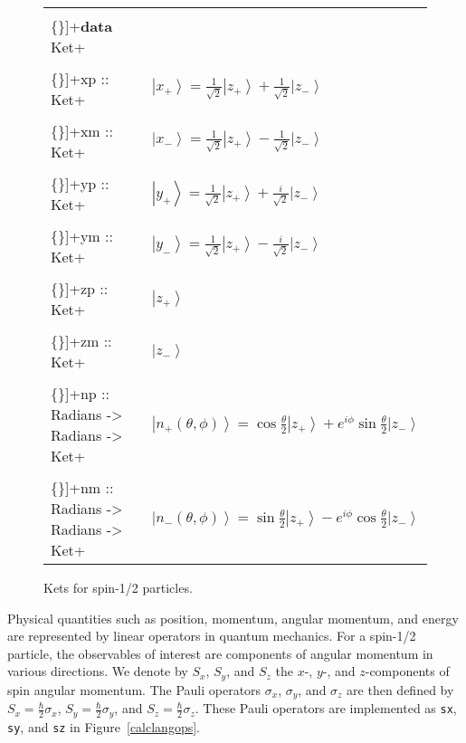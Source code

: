 \documentclass{eptcs}
\newcommand{\VERB}{\Verb[commandchars=\\\{\}]}
\newcommand{\KeywordTok}[1]{\textcolor[rgb]{0.00,0.44,0.13}{\textbf{{#1}}}}
\newcommand{\DataTypeTok}[1]{\textcolor[rgb]{0.56,0.13,0.00}{{#1}}}
\newcommand{\SpecialCharTok}[1]{\textcolor[rgb]{0.25,0.44,0.63}{{#1}}}
\newcommand{\FunctionTok}[1]{\textcolor[rgb]{0.02,0.16,0.49}{{#1}}}
\newcommand{\ket}[1]{\left| #1 \right\rangle}
\begin{document}
\begin{figure}
\begin{tabular}{ll}
\VERB+\KeywordTok{data} \DataTypeTok{Ket}+ \\
\VERB+\FunctionTok{xp} \SpecialCharTok{::} \DataTypeTok{Ket}+ & $\ket{x_+} = \frac{1}{\sqrt{2}} \ket{z_+} + \frac{1}{\sqrt{2}} \ket{z_-}$ \\
\VERB+\FunctionTok{xm} \SpecialCharTok{::} \DataTypeTok{Ket}+ & $\ket{x_-} = \frac{1}{\sqrt{2}} \ket{z_+} - \frac{1}{\sqrt{2}} \ket{z_-}$ \\
\VERB+\FunctionTok{yp} \SpecialCharTok{::} \DataTypeTok{Ket}+ & $\ket{y_+} = \frac{1}{\sqrt{2}} \ket{z_+} + \frac{i}{\sqrt{2}} \ket{z_-}$ \\
\VERB+\FunctionTok{ym} \SpecialCharTok{::} \DataTypeTok{Ket}+ & $\ket{y_-} = \frac{1}{\sqrt{2}} \ket{z_+} - \frac{i}{\sqrt{2}} \ket{z_-}$ \\
\VERB+\FunctionTok{zp} \SpecialCharTok{::} \DataTypeTok{Ket}+ & $\ket{z_+}$ \\
\VERB+\FunctionTok{zm} \SpecialCharTok{::} \DataTypeTok{Ket}+ & $\ket{z_-}$ \\
\VERB+\FunctionTok{np} \SpecialCharTok{::} \DataTypeTok{Radians} \SpecialCharTok{->} \DataTypeTok{Radians} \SpecialCharTok{->} \DataTypeTok{Ket}+ & $\ket{n_+(\theta,\phi)} = \cos \frac{\theta}{2} \ket{z_+} + e^{i \phi} \sin \frac{\theta}{2} \ket{z_-}$ \\
\VERB+\FunctionTok{nm} \SpecialCharTok{::} \DataTypeTok{Radians} \SpecialCharTok{->} \DataTypeTok{Radians} \SpecialCharTok{->} \DataTypeTok{Ket}+ & $\ket{n_-(\theta,\phi)} = \sin \frac{\theta}{2} \ket{z_+} - e^{i \phi} \cos \frac{\theta}{2} \ket{z_-}$
\end{tabular}
\caption{Kets for spin-1/2 particles.}
\label{calclangkets}
\end{figure}

Physical quantities
such as position, momentum, angular momentum, and energy
are represented by linear operators in quantum mechanics.
For a spin-1/2 particle, the observables of interest are
components of angular momentum in various directions.
We denote by $S_x$, $S_y$, and $S_z$ the $x$-, $y$-, and
$z$-components of spin angular momentum.
The Pauli operators $\sigma_x$, $\sigma_y$, and $\sigma_z$
are then defined by $S_x = \frac{\hbar}{2} \sigma_x$,
$S_y = \frac{\hbar}{2} \sigma_y$, and
$S_z = \frac{\hbar}{2} \sigma_z$.
These Pauli operators are implemented as
\FunctionTok{\texttt{sx}},
\FunctionTok{\texttt{sy}}, and
\FunctionTok{\texttt{sz}} in Figure~\ref{calclangops}.
\end{document}
